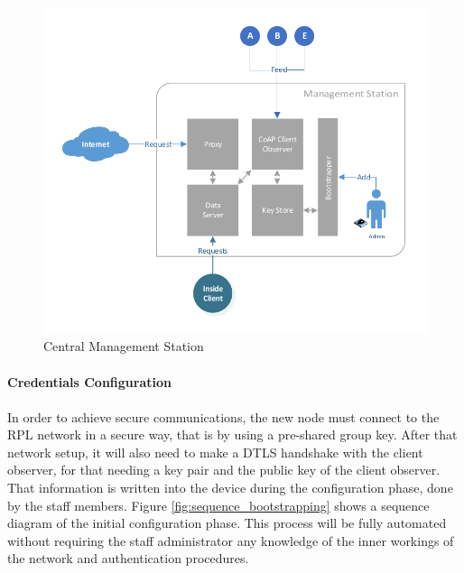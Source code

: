 \begin{figure}[h]
  \centering
  \includegraphics[width=0.92\linewidth]{figures/White_Box_Model.pdf}
  \caption{Central Management Station}
  \label{fig:core_components}
\end{figure}

\paragraph{\textbf{Credentials Configuration}}
\paragraph{}

In order to achieve secure communications, the new node must connect to the RPL network in a secure way, that is by using a pre-shared group key. After that network setup, it will also need to make a DTLS handshake with the client observer, for that needing a key pair and the public key of the client observer. That information is written into the device during the configuration phase, done by the staff members. Figure \ref{fig:sequence_bootstrapping} shows a sequence diagram of the initial configuration phase. This process will be fully automated without requiring the staff administrator any knowledge of the inner workings of the network and authentication procedures.

